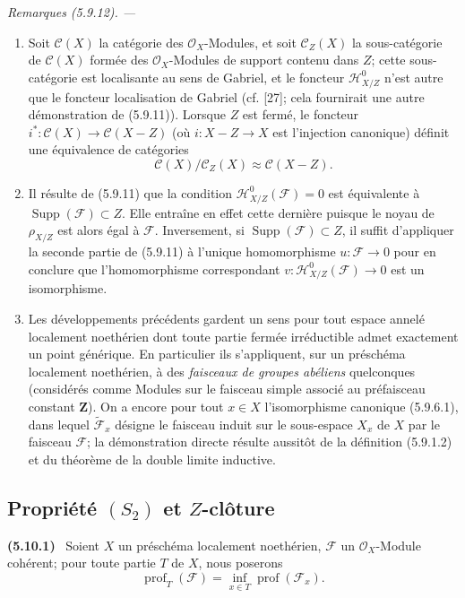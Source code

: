 \documentclass[10pt,oneside]{book}
\newenvironment{env}[1][]{\par\medskip\noindent\textbf{(#1)}\ }{\par}
\newenvironment{remarks}[1][]{%
  \par\medskip\noindent\itshape Remarques (#1). ---\ }{\par}
\begin{document}
\begin{remarks}[5.9.12]
\label{IV.2.s5.9.12-fr}
\begin{enumerate}
\item[(i)] Soit $\mathcal C(X)$ la catégorie des $\mathcal O_X$-Modules, et
soit $\mathcal C_Z(X)$ la sous-catégorie de $\mathcal C(X)$ formée des
$\mathcal O_X$-Modules de support contenu dans $Z$; cette sous-catégorie est
localisante au sens de Gabriel, et le foncteur $\mathcal H^0_{X/Z}$ n'est
autre que le foncteur localisation de Gabriel (cf. [27]; cela fournirait une
autre démonstration de (5.9.11)). Lorsque $Z$ est fermé, le foncteur
$i^*:\mathcal C(X)\to\mathcal C(X-Z)$ (où $i:X-Z\to X$ est l'injection
canonique) définit une équivalence de catégories
\[
\mathcal C(X)/\mathcal C_Z(X)\approx\mathcal C(X-Z).
\]
\item[(ii)] Il résulte de (5.9.11) que la condition
$\mathcal H^0_{X/Z}(\mathcal F)=0$ est équivalente à
$\operatorname{Supp}(\mathcal F)\subset Z$. Elle entraîne en effet cette
dernière puisque le noyau de $\rho_{X/Z}$ est alors égal à $\mathcal F$.
Inversement, si $\operatorname{Supp}(\mathcal F)\subset Z$, il suffit
d'appliquer la seconde partie de (5.9.11) à l'unique homomorphisme
$u:\mathcal F\to0$ pour en conclure que l'homomorphisme correspondant
$v:\mathcal H^0_{X/Z}(\mathcal F)\to0$ est un isomorphisme.
\item[(iii)] Les développements précédents gardent un sens pour tout espace
annelé localement noethérien dont toute partie fermée irréductible admet
exactement un point générique. En particulier ils s'appliquent, sur un
préschéma localement noethérien, à des \emph{faisceaux de groupes abéliens}
quelconques (considérés comme Modules sur le faisceau simple associé au
préfaisceau constant $\mathbf Z$). On a encore pour tout $x\in X$
l'isomorphisme canonique (5.9.6.1), dans lequel
$\widetilde{\mathcal F}_x$ désigne le faisceau induit sur le sous-espace
$X_x$ de $X$ par le faisceau $\mathcal F$; la démonstration directe résulte
aussitôt de la définition (5.9.1.2) et du théorème de la double limite
inductive.
\end{enumerate}
\end{remarks}

\subsection{\texorpdfstring{Propriété $(S_2)$ et $Z$-clôture}{Propriété (S\string_2) et Z-clôture}}

\begin{env}[5.10.1]
\label{IV.2.s5.10.1-fr}
Soient $X$ un préschéma localement noethérien, $\mathcal F$ un
$\mathcal O_X$-Module cohérent; pour toute partie $T$ de $X$, nous poserons
\begin{equation}
\operatorname{prof}_T(\mathcal F)
=\inf_{x\in T}\operatorname{prof}(\mathcal F_x).
\tag{5.10.1.1}\label{IV.2.s5.10.1.1-fr}
\end{equation}
\end{env}
\end{document}
